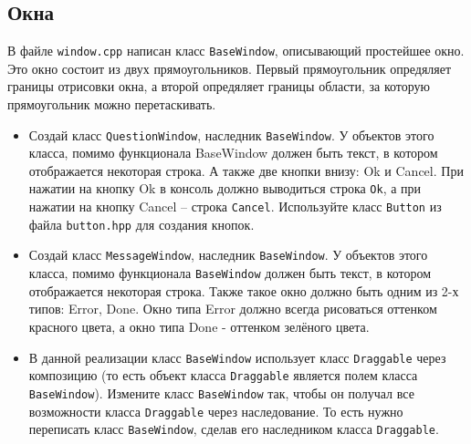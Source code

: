 \documentclass{article}
\begin{document}
\subsection{Окна}
В файле \texttt{window.cpp} написан класс \texttt{BaseWindow}, описывающий простейшее окно. Это окно состоит из двух прямоугольников. Первый прямоугольник опредяляет границы отрисовки окна, а второй опредяляет границы области, за которую прямоугольник можно перетаскивать.

\begin{itemize}
\item Создай класс \texttt{QuestionWindow}, наследник \texttt{BaseWindow}.
У объектов этого класса, помимо функционала BaseWindow должен быть текст, в котором отображается некоторая строка. А также две кнопки внизу: Ok и Cancel. При нажатии на кнопку Ok в консоль должно выводиться строка \texttt{Ok}, а при нажатии на кнопку Cancel -- строка \texttt{Cancel}. Используйте класс \texttt{Button} из файла \texttt{button.hpp} для создания кнопок.

\item Создай класс \texttt{MessageWindow}, наследник \texttt{BaseWindow}.
У объектов этого класса, помимо функционала \texttt{BaseWindow} должен быть текст, в котором отображается некоторая строка. Также такое окно должно быть одним из 2-х типов: Error, Done. Окно типа Error должно всегда рисоваться оттенком красного цвета, а окно типа Done - оттенком зелёного цвета.

\item В данной реализации класс \texttt{BaseWindow} использует класс \texttt{Draggable} через композицию (то есть объект класса \texttt{Draggable} является полем класса \texttt{BaseWindow}). Измените класс \texttt{BaseWindow} так, чтобы он получал все возможности класса \texttt{Draggable} через наследование. То есть нужно переписать класс \texttt{BaseWindow}, сделав его наследником класса \texttt{Draggable}. 

\end{itemize}


        
\end{document}
